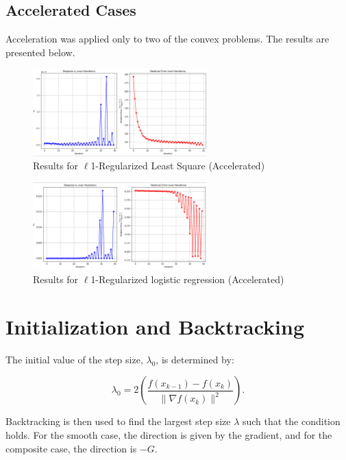 \documentclass{article}
\begin{document}
\clearpage 



\subsection{Accelerated Cases}
Acceleration was applied only to two of the convex problems. The results are presented below.

\begin{figure}[htbp]
    \centering
    \includegraphics[width=0.6\textwidth]{8.png}
    \caption{Results for $\ell$1-Regularized Least Square (Accelerated)}
\end{figure}

\begin{figure}[htbp]
    \centering
    \includegraphics[width=0.6\textwidth]{9.png}
    \caption{Results for $\ell$1-Regularized logistic regression (Accelerated)}
\end{figure}

\section{Initialization and Backtracking}
The initial value of the step size, $\lambda_0$, is determined by:

\[
\lambda_0 = {2} \left( \frac{f(x_{k - 1}) - f(x_k)}{\|\nabla f(x_k)\|^2} \right).
\]

Backtracking is then used to find the largest step size $\lambda$ such that the condition holds. For the smooth case, the direction is given by the gradient, and for the composite case, the direction is $-G$.
\end{document}
